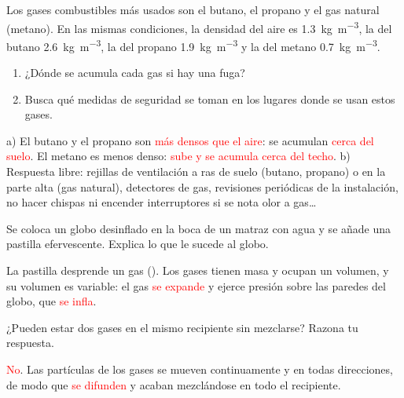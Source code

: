 \begin{exercise}
    Los gases combustibles más usados son el butano, el propano y el gas natural (metano). En las mismas condiciones, la densidad del aire es \qty{1.3}{\kg\per\cubic\metre}, la del butano \qty{2.6}{\kg\per\cubic\metre}, la del propano \qty{1.9}{\kg\per\cubic\metre} y la del metano \qty{0.7}{\kg\per\cubic\metre}.
    \begin{enumerate}[label=\alph*)]
        \item ¿Dónde se acumula cada gas si hay una fuga?
        \item Busca qué medidas de seguridad se toman en los lugares donde se usan estos gases.
    \end{enumerate}
    \begin{solu}
        a) El butano y el propano son \textcolor{red}{más densos que el aire}: se acumulan \textcolor{red}{cerca del suelo}. El metano es menos denso: \textcolor{red}{sube y se acumula cerca del techo}.
        b) Respuesta libre: rejillas de ventilación a ras de suelo (butano, propano) o en la parte alta (gas natural), detectores de gas, revisiones periódicas de la instalación, no hacer chispas ni encender interruptores si se nota olor a gas\ldots
    \end{solu}
\end{exercise}

\begin{exercise}
    Se coloca un globo desinflado en la boca de un matraz con agua y se añade una pastilla efervescente. Explica lo que le sucede al globo.
    \begin{solu}
        La pastilla desprende un gas (). Los gases tienen masa y ocupan un volumen, y su volumen es variable: el gas \textcolor{red}{se expande} y ejerce presión sobre las paredes del globo, que \textcolor{red}{se infla}.
    \end{solu}
\end{exercise}

\begin{exercise}
    ¿Pueden estar dos gases en el mismo recipiente sin mezclarse? Razona tu respuesta.
    \begin{solu}
        \textcolor{red}{No}. Las partículas de los gases se mueven continuamente y en todas direcciones, de modo que \textcolor{red}{se difunden} y acaban mezclándose en todo el recipiente.
    \end{solu}
\end{exercise}

